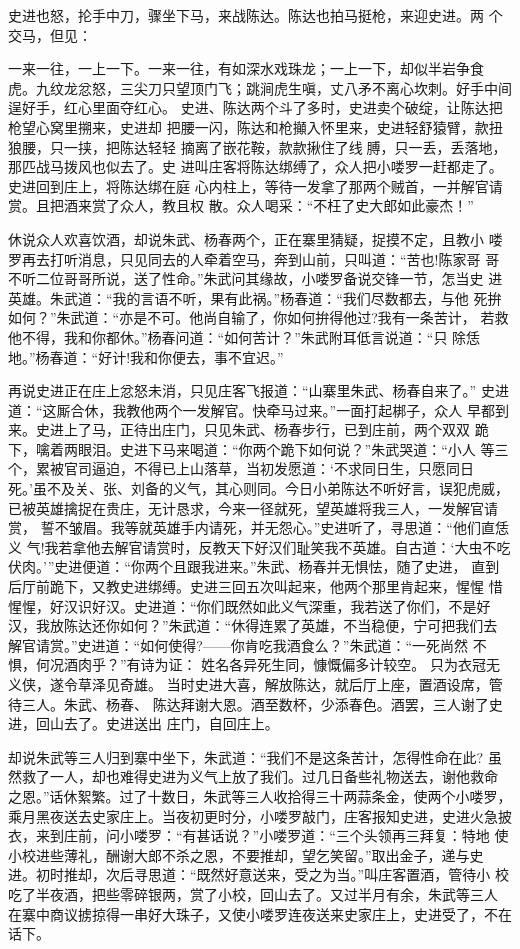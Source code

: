 史进也怒，抡手中刀，骤坐下马，来战陈达。陈达也拍马挺枪，来迎史进。两
个交马，但见：

一来一往，一上一下。一来一往，有如深水戏珠龙；一上一下，却似半岩争食
虎。九纹龙忿怒，三尖刀只望顶门飞；跳涧虎生嗔，丈八矛不离心坎刺。好手中间
逞好手，红心里面夺红心。
史进、陈达两个斗了多时，史进卖个破绽，让陈达把枪望心窝里搠来，史进却
把腰一闪，陈达和枪攧入怀里来，史进轻舒猿臂，款扭狼腰，只一挟，把陈达轻轻
摘离了嵌花鞍，款款揪住了线膊，只一丢，丢落地，那匹战马拨风也似去了。史
进叫庄客将陈达绑缚了，众人把小喽罗一赶都走了。史进回到庄上，将陈达绑在庭
心内柱上，等待一发拿了那两个贼首，一并解官请赏。且把酒来赏了众人，教且权
散。众人喝采：“不枉了史大郎如此豪杰！”

休说众人欢喜饮酒，却说朱武、杨春两个，正在寨里猜疑，捉摸不定，且教小
喽罗再去打听消息，只见同去的人牵着空马，奔到山前，只叫道：“苦也!陈家哥
哥不听二位哥哥所说，送了性命。”朱武问其缘故，小喽罗备说交锋一节，怎当史
进英雄。朱武道：“我的言语不听，果有此祸。”杨春道：“我们尽数都去，与他
死拚如何？”朱武道：“亦是不可。他尚自输了，你如何拚得他过?我有一条苦计，
若救他不得，我和你都休。”杨春问道：“如何苦计？”朱武附耳低言说道：“只
除恁地。”杨春道：“好计!我和你便去，事不宜迟。”

再说史进正在庄上忿怒未消，只见庄客飞报道：“山寨里朱武、杨春自来了。”
史进道：“这厮合休，我教他两个一发解官。快牵马过来。”一面打起梆子，众人
早都到来。史进上了马，正待出庄门，只见朱武、杨春步行，已到庄前，两个双双
跪下，噙着两眼泪。史进下马来喝道：“你两个跪下如何说？”朱武哭道：“小人
等三个，累被官司逼迫，不得已上山落草，当初发愿道：‘不求同日生，只愿同日
死。’虽不及关、张、刘备的义气，其心则同。今日小弟陈达不听好言，误犯虎威，
已被英雄擒捉在贵庄，无计恳求，今来一径就死，望英雄将我三人，一发解官请赏，
誓不皱眉。我等就英雄手内请死，并无怨心。”史进听了，寻思道：“他们直恁义
气!我若拿他去解官请赏时，反教天下好汉们耻笑我不英雄。自古道：‘大虫不吃
伏肉。’”史进便道：“你两个且跟我进来。”朱武、杨春并无惧怯，随了史进，
直到后厅前跪下，又教史进绑缚。史进三回五次叫起来，他两个那里肯起来，惺惺
惜惺惺，好汉识好汉。史进道：“你们既然如此义气深重，我若送了你们，不是好
汉，我放陈达还你如何？”朱武道：“休得连累了英雄，不当稳便，宁可把我们去
解官请赏。”史进道：“如何使得?——你肯吃我酒食么？”朱武道：“一死尚然
不惧，何况酒肉乎？”有诗为证：
姓名各异死生同，慷慨偏多计较空。
只为衣冠无义侠，遂令草泽见奇雄。
当时史进大喜，解放陈达，就后厅上座，置酒设席，管待三人。朱武、杨春、
陈达拜谢大恩。酒至数杯，少添春色。酒罢，三人谢了史进，回山去了。史进送出
庄门，自回庄上。

却说朱武等三人归到寨中坐下，朱武道：“我们不是这条苦计，怎得性命在此?
虽然救了一人，却也难得史进为义气上放了我们。过几日备些礼物送去，谢他救命
之恩。”话休絮繁。过了十数日，朱武等三人收拾得三十两蒜条金，使两个小喽罗，
乘月黑夜送去史家庄上。当夜初更时分，小喽罗敲门，庄客报知史进，史进火急披
衣，来到庄前，问小喽罗：“有甚话说？”小喽罗道：“三个头领再三拜复：特地
使小校进些薄礼，酬谢大郎不杀之恩，不要推却，望乞笑留。”取出金子，递与史
进。初时推却，次后寻思道：“既然好意送来，受之为当。”叫庄客置酒，管待小
校吃了半夜酒，把些零碎银两，赏了小校，回山去了。又过半月有余，朱武等三人
在寨中商议掳掠得一串好大珠子，又使小喽罗连夜送来史家庄上，史进受了，不在
话下。

